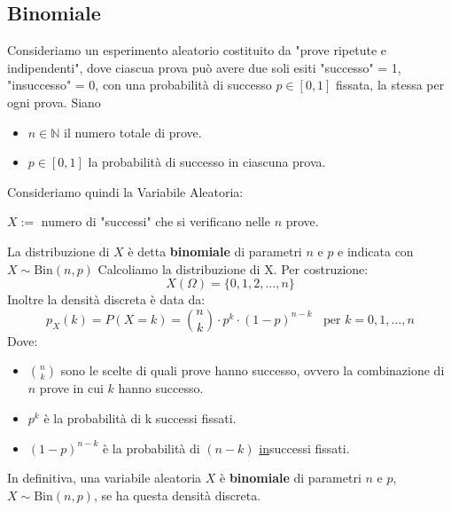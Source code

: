 \subsection{Binomiale}
Consideriamo un esperimento aleatorio costituito da "prove ripetute e indipendenti",
dove ciascua prova può avere due soli esiti "successo" = 1, "insuccesso" = 0, con una
probabilità di successo $p \in [0,1]$ fissata, la stessa per ogni prova.
Siano \begin{itemize}
    \item $n \in \mathbb{N}$ il numero totale di prove.
    \item $p \in [0,1]$ la probabilità di successo in ciascuna prova.
\end{itemize}
Consideriamo quindi la Variabile Aleatoria:
\begin{center}
    $X:=$ numero di "successi" che si verificano nelle $n$ prove.
\end{center} 
La distribuzione di $X$ è detta \textbf{binomiale} di parametri $n$ e $p$ e indicata con $X \sim \text{Bin}(n,p)$
Calcoliamo la distribuzione di X. Per costruzione:
\[
    X(\Omega) = \{0,1,2,\dots,n\}
\]
Inoltre la densità discreta è data da:
\begin{equation*}
    p_X (k) = P(X=k) = \binom{n}{k} \cdot p^k \cdot (1-p)^{n-k} \;\;\text{ per } k = 0,1,\dots, n
\end{equation*}
Dove: \begin{itemize}
    \item $\binom{n}{k}$ sono le scelte di quali prove hanno successo,
    ovvero la combinazione di $n$ prove in cui $k$ hanno successo.
    \item $p^k$ è la probabilità di k successi fissati.
    \item $(1-p)^{n-k}$ è la probabilità di $(n-k)$ \underline{in}successi fissati.
\end{itemize}
In definitiva, una variabile aleatoria $X$ è \textbf{binomiale} di parametri $n$ e $p$, $X \sim \text{Bin}(n,p)$,
se ha questa densità discreta.

